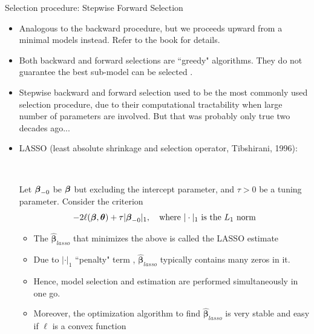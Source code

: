 \documentclass{beamer}
\begin{document}
\begin{frame} {Selection procedure: Stepwise Forward  Selection}
\begin{itemize}
\item Analogous to the backward procedure, but we proceeds upward from a minimal models instead. Refer to the book for details. 



\item 
Both backward and forward selections are ``greedy" algorithms. They  do  not guarantee the best sub-model can be selected .


\item
Stepwise backward and forward selection used to be the most commonly used selection procedure, due to their computational  tractability when large number of parameters are involved. But that was probably only true two decades ago...



\end{itemize}
\end{frame}

\begin{frame}
\begin{itemize}


\item LASSO (least absolute shrinkage and selection operator, Tibshirani, 1996):

\ \

Let  $\mbox{\boldmath$\beta$}_{-0}$ be
$\mbox{\boldmath $\beta$}$ but excluding the intercept parameter, and $\tau>0$ be a tuning parameter. Consider the criterion
$$-2\ell(\mbox{\boldmath $\beta$},
\mbox{\boldmath $\theta$})+\tau |\mbox{\boldmath $\beta$}_{-0}|_1,
\quad \mbox{where $|\cdot |_1$ is the $L_1$ norm}$$
\begin{itemize}
\item  The $\hat{\boldsymbol \beta}_{lasso}$ that minimizes the above  is called  the LASSO estimate
\item  Due to $|\cdot |_1$ ``penalty" term , $\hat{\boldsymbol \beta}_{lasso}$ typically contains many zeros in it. 
\item Hence, model selection and estimation are performed simultaneously in one go. 
\item Moreover, the optimization algorithm to find $\hat{\boldsymbol \beta}_{lasso}$ is very stable and easy if $\ell$ is a convex function
\end{itemize}
\end{itemize}

\end{frame}
\end{document}
